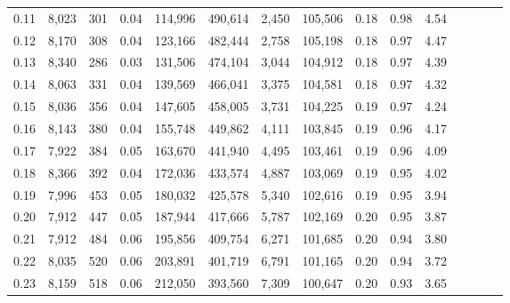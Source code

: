 \begin{tabular}{rrrcrrrrrrrrrrr}
0.11 &   8,023 &    301 &                                       0.04 &  114,996 &  490,614 &    2,450 &  105,506 &  0.18 &  0.98 &                         4.54 \\
0.12 &   8,170 &    308 &                                       0.04 &  123,166 &  482,444 &    2,758 &  105,198 &  0.18 &  0.97 &                         4.47 \\
0.13 &   8,340 &    286 &                                       0.03 &  131,506 &  474,104 &    3,044 &  104,912 &  0.18 &  0.97 &                         4.39 \\
0.14 &   8,063 &    331 &                                       0.04 &  139,569 &  466,041 &    3,375 &  104,581 &  0.18 &  0.97 &                         4.32 \\
0.15 &   8,036 &    356 &                                       0.04 &  147,605 &  458,005 &    3,731 &  104,225 &  0.19 &  0.97 &                         4.24 \\
0.16 &   8,143 &    380 &                                       0.04 &  155,748 &  449,862 &    4,111 &  103,845 &  0.19 &  0.96 &                         4.17 \\
0.17 &   7,922 &    384 &                                       0.05 &  163,670 &  441,940 &    4,495 &  103,461 &  0.19 &  0.96 &                         4.09 \\
0.18 &   8,366 &    392 &                                       0.04 &  172,036 &  433,574 &    4,887 &  103,069 &  0.19 &  0.95 &                         4.02 \\
0.19 &   7,996 &    453 &                                       0.05 &  180,032 &  425,578 &    5,340 &  102,616 &  0.19 &  0.95 &                         3.94 \\
0.20 &   7,912 &    447 &                                       0.05 &  187,944 &  417,666 &    5,787 &  102,169 &  0.20 &  0.95 &                         3.87 \\
0.21 &   7,912 &    484 &                                       0.06 &  195,856 &  409,754 &    6,271 &  101,685 &  0.20 &  0.94 &                         3.80 \\
0.22 &   8,035 &    520 &                                       0.06 &  203,891 &  401,719 &    6,791 &  101,165 &  0.20 &  0.94 &                         3.72 \\
0.23 &   8,159 &    518 &                                       0.06 &  212,050 &  393,560 &    7,309 &  100,647 &  0.20 &  0.93 &                         3.65 \\

\end{tabular}
